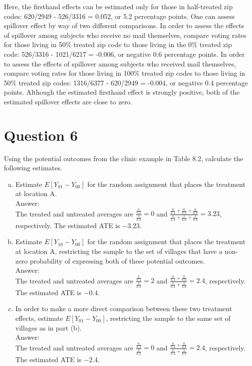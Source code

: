 \documentclass[11pt,notitlepage]{article}\usepackage[]{graphicx}\usepackage[]{color}
\begin{document}
\begin{enumerate}[a)]
Here, the firsthand effects can be estimated only for those in half-treated zip codes: 620/2949 - 526/3316 = 0.052, or 5.2 percentage points. One can assess spillover effect by way of two different comparisons. In order to assess the effects of spillover among subjects who receive no mail themselves, compare voting rates for those living in 50\% treated zip code to those living in the 0\% treated zip code: 526/3316 - 1021/6217 = -0.006, or negative 0.6 percentage points. In order to assess the effects of spillover among subjects who received mail themselves, compare voting rates for those living in 100\% treated zip codes to those living in 50\% treated zip codes:  1316/6377 - 620/2949 = -0.004, or negative 0.4 percentage points.  Although the estimated firsthand effect is strongly positive, both of the estimated spillover effects are close to zero.
\end{enumerate}

\section*{Question 6}
Using the potential outcomes from the clinic example in Table 8.2, calculate the following estimates.
\begin{enumerate}[a)]
\item Estimate $E[Y_{01} - Y_{00}]$ for the random assignment that places the treatment at location A. \\
Answer:\\
The treated and untreated averages are $\frac{\frac{0}{0.2}}{\frac{1}{0.2}} =0$ and $\frac{\frac{0}{0.4}+\frac{6}{0.6}+\frac{6}{0.8}}{\frac{1}{0.4}+\frac{1}{0.6}+\frac{1}{0.8}} = 3.23$, respectively.  The estimated ATE is $-3.23$.
\item Estimate $E[Y_{10} - Y_{00}]$ for the random assignment that places the treatment at location A, restricting the sample to the set of villages that have a non-zero probability of expressing both of these potential outcomes.\\
Answer:\\
The treated and untreated averages are $\frac{\frac{2}{0.4}}{\frac{1}{0.4}} =2$ and $\frac{\frac{0}{0.4}+\frac{6}{0.6}}{\frac{1}{0.4}+\frac{1}{0.6}} = 2.4$, respectively.  The estimated ATE is $-0.4$.
\item In order to make a more direct comparison between these two treatment effects, estimate $E[Y_{01} - Y_{00}]$, restricting the sample to the same set of villages as in part (b).\\
Answer:\\
The treated and untreated averages are $\frac{\frac{0}{0.2}}{\frac{1}{0.2}} =0$ and $\frac{\frac{0}{0.4}+\frac{6}{0.6}}{\frac{1}{0.4}+\frac{1}{0.6}} = 2.4$, respectively.  The estimated ATE is $-2.4$.
\end{enumerate}
\end{document}
